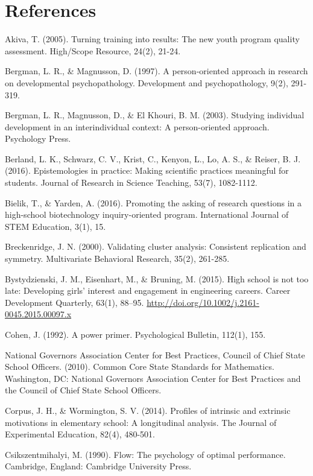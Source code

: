 \documentclass[]{book}
\theoremstyle{definition}
\theoremstyle{definition}
\theoremstyle{definition}
\theoremstyle{remark}
\begin{document}
\chapter{References}\label{references}

\setlength{\parindent}{-0.2in} \setlength{\leftskip}{0.2in}
\setlength{\parskip}{8pt} \noindent

Akiva, T. (2005). Turning training into results: The new youth program
quality assessment. High/Scope Resource, 24(2), 21-24.

Bergman, L. R., \& Magnusson, D. (1997). A person-oriented approach in
research on developmental psychopathology. Development and
psychopathology, 9(2), 291-319.

Bergman, L. R., Magnusson, D., \& El Khouri, B. M. (2003). Studying
individual development in an interindividual context: A person-oriented
approach. Psychology Press.

Berland, L. K., Schwarz, C. V., Krist, C., Kenyon, L., Lo, A. S., \&
Reiser, B. J. (2016). Epistemologies in practice: Making scientific
practices meaningful for students. Journal of Research in Science
Teaching, 53(7), 1082-1112.

Bielik, T., \& Yarden, A. (2016). Promoting the asking of research
questions in a high-school biotechnology inquiry-oriented program.
International Journal of STEM Education, 3(1), 15.

Breckenridge, J. N. (2000). Validating cluster analysis: Consistent
replication and symmetry. Multivariate Behavioral Research, 35(2),
261-285.

Bystydzienski, J. M., Eisenhart, M., \& Bruning, M. (2015). High school
is not too late: Developing girls' interest and engagement in
engineering careers. Career Development Quarterly, 63(1), 88--95.
\url{http://doi.org/10.1002/j.2161-0045.2015.00097.x}

Cohen, J. (1992). A power primer. Psychological Bulletin, 112(1), 155.

National Governors Association Center for Best Practices, Council of
Chief State School Officers. (2010). Common Core State Standards for
Mathematics. Washington, DC: National Governors Association Center for
Best Practices and the Council of Chief State School Officers.

Corpus, J. H., \& Wormington, S. V. (2014). Profiles of intrinsic and
extrinsic motivations in elementary school: A longitudinal analysis. The
Journal of Experimental Education, 82(4), 480-501.

Csikszentmihalyi, M. (1990). Flow: The psychology of optimal
performance. Cambridge, England: Cambridge University Press.
\end{document}
